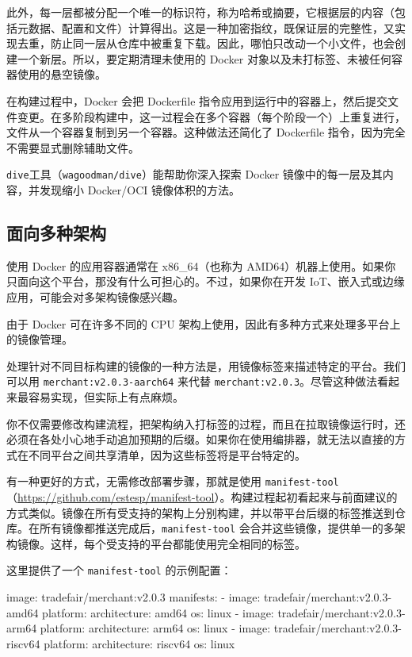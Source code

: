 此外，每一层都被分配一个唯一的标识符，称为哈希或摘要，它根据层的内容（包括元数据、配置和文件）计算得出。这是一种加密指纹，既保证层的完整性，又实现去重，防止同一层从仓库中被重复下载。因此，哪怕只改动一个小文件，也会创建一个新层。所以，要定期清理未使用的 Docker 对象以及未打标签、未被任何容器使用的悬空镜像。

在构建过程中，Docker 会把 Dockerfile 指令应用到运行中的容器上，然后提交文件变更。在多阶段构建中，这一过程会在多个容器（每个阶段一个）上重复进行，文件从一个容器复制到另一个容器。这种做法还简化了 Dockerfile 指令，因为完全不需要显式删除辅助文件。

\texttt{dive}工具（\texttt{wagoodman/\allowbreak{}dive}）能帮助你深入探索 Docker 镜像中的每一层及其内容，并发现缩小 Docker/OCI 镜像体积的方法。

\subsection{面向多种架构}

使用 Docker 的应用容器通常在 x86\_64（也称为 AMD64）机器上使用。如果你只面向这个平台，那没有什么可担心的。不过，如果你在开发 IoT、嵌入式或边缘应用，可能会对多架构镜像感兴趣。

\label{idx:1761}
由于 Docker 可在许多不同的 CPU 架构上使用，因此有多种方式来处理多平台上的镜像管理。

处理针对不同目标构建的镜像的一种方法是，用镜像标签来描述特定的平台。我们可以用 \texttt{merchant:v2.\allowbreak{}0.\allowbreak{}3-aarch64} 来代替 \texttt{merchant:v2.\allowbreak{}0.\allowbreak{}3}。尽管这种做法看起来最容易实现，但实际上有点麻烦。

你不仅需要修改构建流程，把架构纳入打标签的过程，而且在拉取镜像运行时，还必须在各处小心地手动追加预期的后缀。如果你在使用编排器，就无法以直接的方式在不同平台之间共享清单，因为这些标签将是平台特定的。

\label{idx:1762}
有一种更好的方式，无需修改部署步骤，那就是使用 \texttt{manifest-tool}（\href{https://github.com/estesp/manifest-tool}{https://github.com/estesp/manifest-tool}）。构建过程起初看起来与前面建议的方式类似。镜像在所有受支持的架构上分别构建，并以带平台后缀的标签推送到仓库。在所有镜像都推送完成后，\texttt{manifest-tool} 会合并这些镜像，提供单一的多架构镜像。这样，每个受支持的平台都能使用完全相同的标签。

这里提供了一个 \texttt{manifest-tool} 的示例配置：

\begin{codebox}[yaml]
image: tradefair/merchant:v2.0.3
manifests:
  - image: tradefair/merchant:v2.0.3-amd64
    platform:
      architecture: amd64
      os: linux
  - image: tradefair/merchant:v2.0.3-arm64
    platform:
      architecture: arm64
      os: linux
  - image: tradefair/merchant:v2.0.3-riscv64
    platform:
      architecture: riscv64
      os: linux
\end{codebox}

